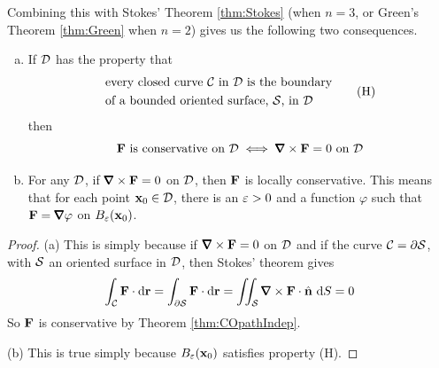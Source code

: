Combining this with Stokes' Theorem \ref{thm:Stokes} 
(when $n=3$, or Green's Theorem \ref{thm:Green} when $n=2$) gives us the following two consequences.
\begin{theorem}\label{thm:closedExact}
\begin{enumerate}[(a)]
\item
If $\mathcal{D}$ has the property that 
\begin{equation}
\begin{split}
&\text{every closed curve $\mathcal{C}$ in $\mathcal{D}$ is the boundary} \\
&\text{of a bounded oriented surface, $\mathcal{S}$, in $\mathcal{D}$}
\end{split}
\tag{H}\end{equation}
then 
\begin{equation*}
\vF\text{ is conservative on $\cD$}
\iff \vnabla\times \vF=0\text{ on $\cD$}
\end{equation*}

\item 
For any $\mathcal{D}$, if $\vnabla\times \vF=0$ on $\mathcal{D}$,
then $\mathbf{F}$ is locally conservative. This means that for each point
$\mathbf{x}_0\in\mathcal{D}$, there is an $\varepsilon>0$ and a function $\varphi$ such that
$\vF=\vnabla\varphi$ on $B_\varepsilon(\mathbf{x}_0)$. 
\end{enumerate}
\end{theorem}
\begin{proof} (a) 
This is simply because if $\vnabla\times\vF=0$ on $\mathcal{D}$ and if 
the curve $\mathcal{C}=\partial\mathcal{S}$,
with $\mathcal{S}$ an oriented surface in $\mathcal{D}$, then Stokes' theorem gives
\begin{equation*}
\int_\cC \vF\cdot \dee{\vr}
=\int_{\partial\cS} \vF\cdot \dee{\vr}
=\dblInt_\cS \vnabla\times \vF\cdot\hn\ \dee{S}=0
\end{equation*}
So $\mathbf{F}$ is conservative by Theorem \ref{thm:COpathIndep}.


\noindent (b)
This is true simply because
$B_\varepsilon(\mathbf{x}_0)$ satisfies property (H).
\end{proof}

